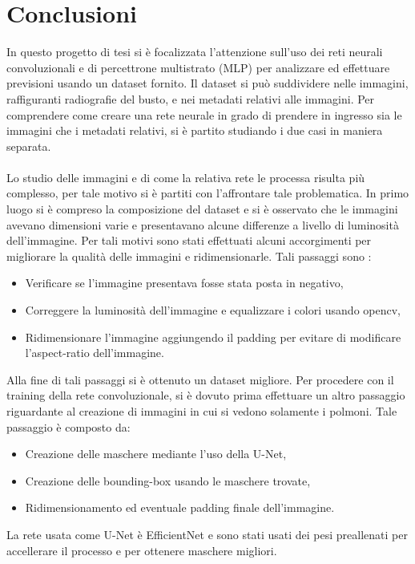 \chapter*{Conclusioni}
In questo progetto di tesi si è focalizzata l'attenzione sull'uso dei reti neurali convoluzionali e di percettrone multistrato (MLP) per analizzare ed effettuare 
previsioni usando un dataset fornito.
Il dataset si può suddividere nelle immagini, raffiguranti radiografie del busto, e nei metadati relativi alle immagini. Per comprendere come creare una rete neurale in grado di prendere in ingresso 
sia le immagini che i metadati relativi, si è partito studiando i due casi in maniera separata.
\\\\
Lo studio delle immagini e di come la relativa rete le processa risulta più complesso, per tale motivo si è partiti con l'affrontare tale 
problematica.
In primo luogo si è compreso la composizione del dataset e si è osservato che le immagini avevano dimensioni varie e presentavano alcune differenze a livello 
di luminosità dell'immagine. Per tali motivi sono stati effettuati alcuni accorgimenti per migliorare la qualità delle immagini e ridimensionarle.
Tali passaggi sono :
\begin{itemize}
    \item Verificare se l'immagine presentava fosse stata posta in negativo,
    \item Correggere la luminosità dell'immagine e equalizzare i colori usando opencv,
    \item Ridimensionare l'immagine aggiungendo il padding per evitare di modificare l'aspect-ratio dell'immagine.
\end{itemize}
Alla fine di tali passaggi si è ottenuto un dataset migliore. Per procedere con il training della rete convoluzionale, si è dovuto prima 
effettuare un altro passaggio riguardante al creazione di immagini in cui si vedono solamente i polmoni. Tale passaggio è composto da:
\begin{itemize}
    \item Creazione delle maschere mediante l'uso della U-Net,
    \item Creazione delle bounding-box usando le maschere trovate,
    \item Ridimensionamento ed eventuale padding finale dell'immagine.
\end{itemize} 
La rete usata come U-Net è EfficientNet e sono stati usati dei pesi preallenati per accellerare il processo e per ottenere maschere migliori.
